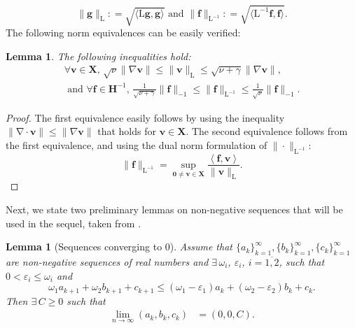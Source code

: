 \documentclass[3p]{elsarticle}
\newtheorem{lemma}[theorem]{Lemma}
\def\V#1{\mathbf{#1}}
\newcommand{\divergence}{\mathrm{\nabla \cdot}}
\newcommand{\Lmap}{\mathrm{L}}
\newcommand{\Linvmap}{\mathrm{L^{-1}}}
\newcommand{\DY}[1]{{\color{black}{#1}}}
\begin{document}
\begin{equation}
    \label{eq:Lnorm}
    \|\V{g}\|_{\Lmap}: = \sqrt{\langle \Lmap \V{g},\V{g} \rangle} \text{ and } 
    \|\V{f}\|_{\Linvmap}: = \sqrt{\langle \Lmap^{-1} \V{f},\V{f} \rangle}.
\end{equation}
%
The following norm equivalences can be easily verified:
\begin{lemma}
The following inequalities hold:
\begin{equation}
\begin{aligned}
\forall \V{v} \in \V{X}, \, \sqrt{\nu}\|\nabla \V{v}\| \le \| \V{v} \|_\Lmap \le \sqrt{\nu+\gamma} \|\nabla \V{v}\|, \\
\text{ and } \forall \V{f} \in \V{H}^{-1}, \, 
 \frac{1}{\sqrt{\nu+\gamma}}\| \V{f} \|_{-1} \le \| \V{f} \|_\Linvmap \le \frac{1}{\sqrt{\nu}} \| \V{f} \|_{-1}.
\end{aligned}
    \label{eq:NormEquiv}
\end{equation}    
\end{lemma}
\begin{proof}
    The first equivalence easily follows by using the inequality $\|\divergence \V{v}\| \le \|\nabla \V{v}\|$ that holds for $\V{v} \in \V{X}$. The second equivalence follows from the first equivalence, and using the dual norm formulation of $\| \cdot \|_\Linvmap$:
    \begin{equation}
        \label{eq:DualNorm}
        \| \V{f} \|_\Linvmap = \sup\limits_{\V{0} \neq \V{v} \in \V{X}}\frac{\left\langle \V{f},\V{v} \right\rangle}{\| \V{v} \|_{\Lmap}}.
    \end{equation}
\end{proof}
Next, we state two preliminary lemmas on non-negative sequences that will be used in the sequel, taken from \cite{Calcolo2026}.
\begin{lemma}[Sequences converging to $0$]\label{lem:SeqConv0}
 Assume that $\{a_k\}_{k=1}^\infty, \{b_k\}_{k=1}^\infty, \{c_k\}_{k=1}^\infty$ are non-negative sequences of real numbers and $\exists \, \omega_i$, $\varepsilon_i$, $i=\overline{1,2}$, such that $0<\varepsilon_i \le \omega_i$ and 
 \begin{equation*}
  \omega_1 a_{k+1} + \omega_2 b_{k+1} + c_{k+1} \leq \left(\omega_1-\varepsilon_1 \right) a_k + \left(\omega_2 - \varepsilon_2 \right) b_{k} + c_{k}.
 \end{equation*}
Then $\exists \, C \ge 0$ such that 
\begin{align*}
 \lim\limits_{n \rightarrow \infty} \left(a_k,b_k,c_k\right) & = (0,0,C).
\end{align*}
\end{lemma}
\end{document}
